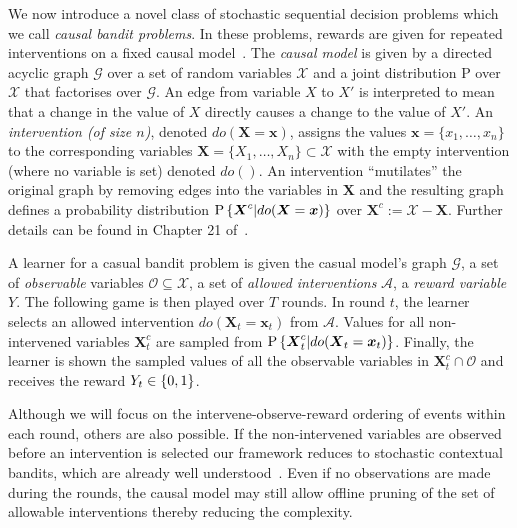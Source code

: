 \newcommand{\bernoulli}{\operatorname{Bernoulli}}
\newcommand{\dirac}{\operatorname{Dirac}}
\renewcommand{\vec}[1]{\boldsymbol{#1}}

We now introduce a novel class of stochastic sequential decision problems which we call \emph{causal bandit problems}. 
In these problems, rewards are given for repeated interventions on a fixed causal model~\cite{Pearl2000}. 
The \emph{causal model} is given by a directed acyclic graph $\mathcal{G}$ over a set of random variables $\mathcal{X}$ and a joint distribution $\mathrm{P}$ over $\mathcal{X}$ that factorises over $\mathcal{G}$. 
An edge from variable $X$ to $X'$ is interpreted to mean that a change in the value of $X$ directly causes a change to the value of $X'$. 
An \emph{intervention (of size $n$)}, denoted $do(\vec{X}=\vec{x})$, assigns the values $\vec{x}=\{x_1, \ldots, x_n\}$ to the corresponding variables $\vec{X}=\{X_1, \ldots, X_n\} \subset \mathcal{X}$ with the empty intervention (where no variable is set) denoted $do()$.
An intervention ``mutilates'' the original graph by removing edges into the variables in $\vec{X}$ and the resulting graph defines a probability distribution $\P{\vec{X}^c | do(\vec{X}=\vec{x})}$ over $\vec{X}^c := \mathcal{X} - \vec{X}$. 
Further details can be found in Chapter 21 of~\cite{Koller2009}.

A learner for a casual bandit problem is given the casual model's graph $\mathcal{G}$, a set of \emph{observable} variables $\mathcal{O} \subseteq \mathcal{X}$, a set of \emph{allowed interventions} $\mathcal{A}$, a \emph{reward variable} $Y$. 
The following game is then played over $T$ rounds.
In round $t$, the learner selects an allowed intervention $do(\vec{X}_t = \vec{x}_t)$ from $\mathcal{A}$.
Values for all non-intervened variables $\vec{X}^c_t$ are sampled from $\P{\vec{X}^c_t | do(\vec{X}_t = \vec{x}_t)}$. Finally, the learner is shown the sampled values of all the observable variables in $\vec{X}^c_t \cap \mathcal{O}$ and receives the reward $Y_t \in \left\{0,1\right\}$.

Although we will focus on the intervene-observe-reward ordering of events within each round, others are also possible. 
If the non-intervened variables are observed before an intervention is selected our framework reduces to stochastic contextual bandits, which are already well understood~\citep{Agarwal2014}. 
Even if no observations are made during the rounds, the causal model may still allow offline pruning of the set of 
allowable interventions thereby reducing the complexity.

